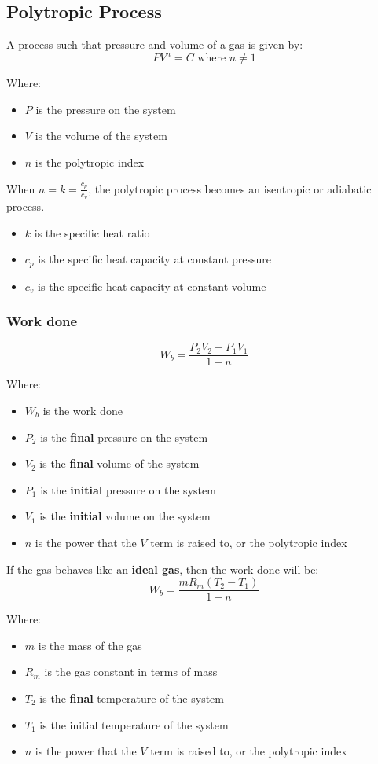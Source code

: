 \documentclass[11pt]{article}
\begin{document}
\subsection{Polytropic Process}
\label{sec:orgc3df78f}
A process such that pressure and volume of a gas is given by:
\[PV^n = C \text{ where } n \ne 1\]

Where:
\begin{itemize}
\item \(P\) is the pressure on the system
\item \(V\) is the volume of the system
\item \(n\) is the polytropic index
\end{itemize}

When \(n = k = \frac{c_p}{c_v}\), the polytropic process becomes an isentropic or adiabatic process.
\begin{itemize}
\item \(k\) is the specific heat ratio
\item \(c_p\) is the specific heat capacity at constant pressure
\item \(c_v\) is the specific heat capacity at constant volume
\end{itemize}

\newpage
\subsubsection{Work done}
\label{sec:org90a9af3}
\[W_b = \frac{P_2 V_2 - P_1 V_1}{1 - n}\]

Where:
\begin{itemize}
\item \(W_b\) is the work done
\item \(P_2\) is the \textbf{final} pressure on the system
\item \(V_2\) is the \textbf{final} volume of the system
\item \(P_1\) is the \textbf{initial} pressure on the system
\item \(V_1\) is the \textbf{initial} volume on the system
\item \(n\) is the power that the \(V\) term is raised to, or the polytropic index
\end{itemize}

If the gas behaves like an \textbf{ideal gas}, then the work done will be:
\[W_b = \frac{m R_m (T_2 - T_1)}{1 - n}\]

Where:
\begin{itemize}
\item \(m\) is the mass of the gas
\item \(R_m\) is the gas constant in terms of mass
\item \(T_2\) is the \textbf{final} temperature of the system
\item \(T_1\) is the initial temperature of the system
\item \(n\) is the power that the \(V\) term is raised to, or the polytropic index
\end{itemize}
\end{document}
